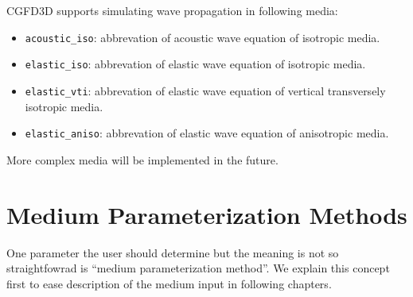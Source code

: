 CGFD3D supports simulating wave propagation in following media:
\begin{itemize}
    \item \texttt{acoustic\_iso}: abbrevation of acoustic wave equation of isotropic media.  
    \item \texttt{elastic\_iso}: abbrevation of elastic wave equation of isotropic media.
    \item \texttt{elastic\_vti}: abbrevation of elastic wave equation of vertical transversely isotropic media. 
    \item \texttt{elastic\_aniso}: abbrevation of elastic wave equation of anisotropic media. 
\end{itemize}
More complex media will be implemented in the future.

\section{Medium Parameterization Methods} \label{equivalent_method} 

One parameter the user should determine but the meaning is not so straightfowrad is ``medium parameterization method''.
We explain this concept first to ease description of the medium input in following chapters.

